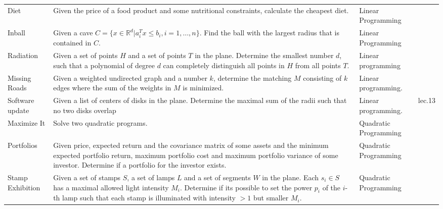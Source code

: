 \documentclass[a4paper, 10pt]{article}
\begin{document}
\begin{longtable}{ L{2cm} L{8cm} L{4cm} r}
        Diet 
        & Given the price of a food product and some nutritional constraints, calculate the cheapest diet.
        & Linear Programming &  \pageref{sec:diet} \\

        Inball 
        & Given a cave $C=\{x\in \mathbb{R} ^d|a_i^Tx\leq b_i, i=1,\dots,n\}.$ Find the ball with the largest radius that is contained in $C$.
        & Linear Programming &  \pageref{sec:inball} \\

        Radiation 
        & Given a set of points $H$ and a set of points $T$ in the plane. Determine the smallest number $d$, such that a polynomial 
            of degree $d$ can completely distinguish all points in $H$ from all points $T$.
            & Linear programming &  \pageref{sec:radiation} \\

        Missing Roads 
        & Given a weighted undirected graph and a number $k$, 
            determine the matching $M$ consisting of $k$ edges where the sum of the weights in $M$ is minimized.
        & Linear programming. & \pageref{sec:missing_roads} \\

        Software update 
        & Given a list of centers of disks in the plane. Determine the maximal sum of the radii such that no two disks overlap
        & Linear programming. & lec.13 \\



        Maximize It
        & Solve two quadratic programs. 
        & Quadratic Programming &  \pageref{sec:maximize_it} \\

        Portfolios 
        & Given price, expected return and the covariance matrix of some assets 
            and the minimum expected portfolio return, maximum portfolio cost  and maximum portfolio variance of some investor. 
            Determine if a portfolio for the investor exists.
        & Quadratic Programming &  \pageref{sec:portfolios} \\

        Stamp Exhibition 
        & Given a set of stamps $S$, a set of lamps $L$ and a set of segments $W$ in the plane. 
            Each $s_i\in S$ has a maximal allowed light intensity $M_i$. Determine if its possible to 
            set the power $p_i$ of the $i$-th lamp such that each stamp is illuminated with intensity $> 1$ 
            but smaller $M_i$.
        & Quadratic Programming &  \pageref{sec:stamp_exhibition} \\


\end{longtable}
\end{document}
